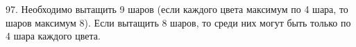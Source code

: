 97. Необходимо вытащить 9 шаров (если каждого цвета максимум по 4 шара, то шаров максимум 8). Если вытащить 8 шаров, то среди них могут быть только по 4 шара каждого цвета.\\
